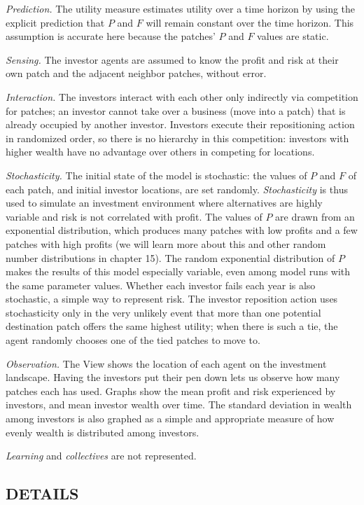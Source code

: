 \documentclass[]{article}
\begin{document}
\emph{Prediction.} The utility measure estimates utility over a time
horizon by using the explicit prediction that \(P\) and \(F\) will
remain constant over the time horizon. This assumption is accurate here
because the patches' \(P\) and \(F\) values are static.

\emph{Sensing.} The investor agents are assumed to know the profit and
risk at their own patch and the adjacent neighbor patches, without
error.

\emph{Interaction.} The investors interact with each other only
indirectly via competition for patches; an investor cannot take over a
business (move into a patch) that is already occupied by another
investor. Investors execute their repositioning action in randomized
order, so there is no hierarchy in this competition: investors with
higher wealth have no advantage over others in competing for locations.

\emph{Stochasticity.} The initial state of the model is stochastic: the
values of \(P\) and \(F\) of each patch, and initial investor
locations, are set randomly. \emph{Stochasticity} is thus used to
simulate an investment environment where alternatives are highly
variable and risk is not correlated with profit. The values of \(P\)
are drawn from an exponential distribution, which produces many patches
with low profits and a few patches with high profits (we will learn more
about this and other random number distributions in chapter 15). The
random exponential distribution of \(P\) makes the results of this
model especially variable, even among model runs with the same parameter
values. Whether each investor fails each year is also stochastic, a
simple way to represent risk. The investor reposition action uses
stochasticity only in the very unlikely event that more than one
potential destination patch offers the same highest utility; when there
is such a tie, the agent randomly chooses one of the tied patches to
move to.

\emph{Observation.} The View shows the location of each agent on the
investment landscape. Having the investors put their pen down lets us
observe how many patches each has used. Graphs show the mean profit and
risk experienced by investors, and mean investor wealth over time. The
standard deviation in wealth among investors is also graphed as a simple
and appropriate measure of how evenly wealth is distributed among
investors.

\emph{Learning} and \emph{collectives} are not represented.

\hypertarget{details}{%
\subsection{DETAILS}\label{details}}
\end{document}
